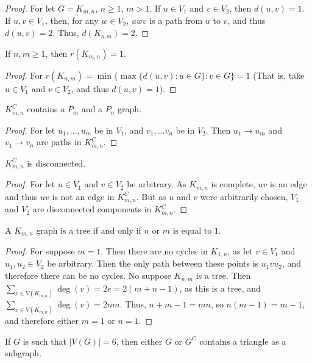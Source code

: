     \begin{proof}
    For let $G=K_{m,n}$, $n\geq1$, $m> 1$. If $u\in V_1$ and $v\in V_2$, then $d(u,v) = 1$. If $u,v\in V_1$, then, for any $w\in V_2$, $uwv$ is a path from $u$ to $v$, and thus $d(u,v) = 2$. Thus, $d(K_{n.m}) = 2$.
    \end{proof}
    \begin{theorem}
    If $n,m\geq 1$, then $r(K_{m,n}) = 1$.
    \end{theorem}
    \begin{proof}
    For $r(K_{n,m}) = \min\{ \max\{d(u,v):u\in G\}: v\in G\} = 1$ (That is, take $u\in V_1$ and $v\in V_2$, and thus $d(u,v)=1$).
    \end{proof}
    \begin{theorem}
    $K_{m,n}^C$ contains a $P_m$ and a $P_n$ graph.
    \end{theorem}
    \begin{proof}
    For let $u_1,\hdots, u_m$ be in $V_1$, and $v_1,\hdots v_n$ be in $V_2$. Then $u_1 \rightarrow u_m$ and $v_1 \rightarrow v_n$ are paths in $K_{m,n}^C$.
    \end{proof}
    \begin{theorem}
    $K_{m,n}^C$ is disconnected.
    \end{theorem}
    \begin{proof}
    For let $u\in V_1$ and $v\in V_2$ be arbitrary. As $K_{m,n}$ is complete, $uv$ is an edge and thus $uv$ is not an edge in $K_{m,n}^C$. But as $u$ and $v$ were arbitrarily chosen, $V_1$ and $V_2$ are disconnected components in $K_{m,n}^C$.
    \end{proof}
    \begin{theorem}
    A $K_{m,n}$ graph is a tree if and only if $n$ or $m$ is equal to $1$.
    \end{theorem}
    \begin{proof}
    For suppose $m=1$. Then there are no cycles in $K_{1,n}$, as let $v\in V_1$ and $u_1,u_2\in V_2$ be arbitrary. Then the only path between these points is $u_1 v u_2$, and therefore there can be no cycles. No suppose $K_{n,m}$ is a tree. Then $\sum_{v\in V(K_{m,n})}\deg(v) = 2e=2(m+n-1)$, as this is a tree, and $\sum_{v\in V(K_{m,n})}\deg(v) = 2nm$. Thus, $n+m-1=mn$, so $n(m-1)=m-1$, and therefore either $m=1$ or $n=1$.
    \end{proof}
    \begin{theorem}
    If $G$ is such that $|V(G)|=6$, then either $G$ or $G^C$ contains a triangle as a subgraph.
    \end{theorem}
